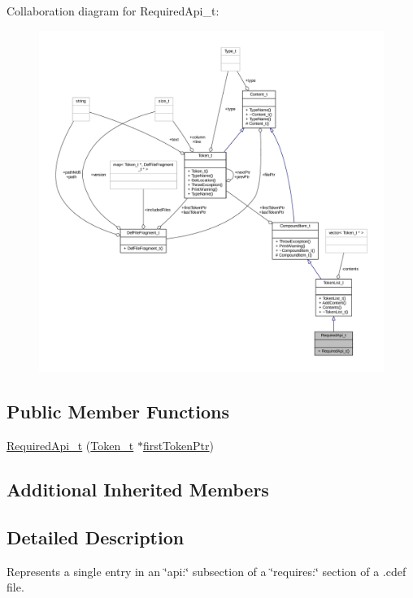Collaboration diagram for Required\+Api\+\_\+t\+:
\nopagebreak
\begin{figure}[H]
\begin{center}
\leavevmode
\includegraphics[width=350pt]{struct_required_api__t__coll__graph}
\end{center}
\end{figure}
\subsection*{Public Member Functions}
\begin{DoxyCompactItemize}
\item 
\hyperlink{struct_required_api__t_ad71a5ee2c2d7bb75fd4a8da30b332782}{Required\+Api\+\_\+t} (\hyperlink{struct_token__t}{Token\+\_\+t} $\ast$\hyperlink{struct_compound_item__t_a4d95dc788120f627e332491589d20c5c}{first\+Token\+Ptr})
\end{DoxyCompactItemize}
\subsection*{Additional Inherited Members}


\subsection{Detailed Description}
Represents a single entry in an \char`\"{}api\+:\char`\"{} subsection of a \char`\"{}requires\+:\char`\"{} section of a .cdef file. 

